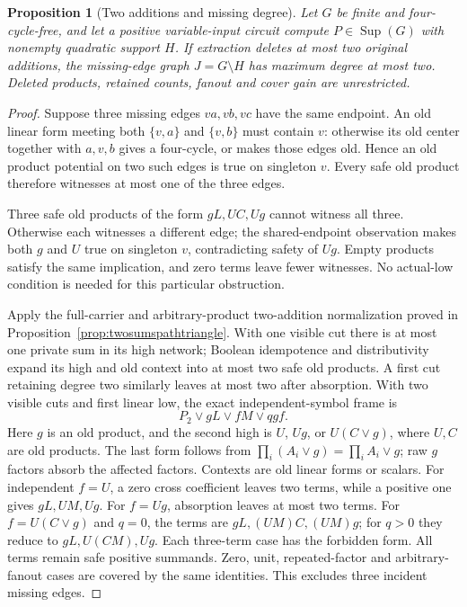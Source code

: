 \documentclass[11pt]{article}
\newcommand{\Sup}{\operatorname{Sup}}
\newtheorem{proposition}[theorem]{Proposition}
\theoremstyle{definition}
\theoremstyle{remark}
\begin{document}
\begin{proposition}[Two additions and missing degree]\label{prop:twosumsdegree}
Let $G$ be finite and four-cycle-free, and let a positive variable-input circuit compute $P\in\Sup(G)$ with nonempty quadratic support $H$. If extraction deletes at most two original additions, the missing-edge graph $J=G\setminus H$ has maximum degree at most two. Deleted products, retained counts, fanout and cover gain are unrestricted.
\end{proposition}
\begin{proof}
Suppose three missing edges $va,vb,vc$ have the same endpoint. An old linear form meeting both $\{v,a\}$ and $\{v,b\}$ must contain $v$: otherwise its old center together with $a,v,b$ gives a four-cycle, or makes those edges old. Hence an old product potential on two such edges is true on singleton $v$. Every safe old product therefore witnesses at most one of the three edges.

Three safe old products of the form $gL,UC,Ug$ cannot witness all three. Otherwise each witnesses a different edge; the shared-endpoint observation makes both $g$ and $U$ true on singleton $v$, contradicting safety of $Ug$. Empty products satisfy the same implication, and zero terms leave fewer witnesses. No actual-low condition is needed for this particular obstruction.

Apply the full-carrier and arbitrary-product two-addition normalization proved in Proposition~\ref{prop:twosumspathtriangle}. With one visible cut there is at most one private sum in its high network; Boolean idempotence and distributivity expand its high and old context into at most two safe old products. A first cut retaining degree two similarly leaves at most two after absorption. With two visible cuts and first linear low, the exact independent-symbol frame is
\[
 P_2\vee gL\vee fM\vee qgf.
\]
Here $g$ is an old product, and the second high is $U$, $Ug$, or $U(C\vee g)$, where $U,C$ are old products. The last form follows from $\prod_i(A_i\vee g)=\prod_i A_i\vee g$; raw $g$ factors absorb the affected factors. Contexts are old linear forms or scalars. For independent $f=U$, a zero cross coefficient leaves two terms, while a positive one gives $gL,UM,Ug$. For $f=Ug$, absorption leaves at most two terms. For $f=U(C\vee g)$ and $q=0$, the terms are $gL,(UM)C,(UM)g$; for $q>0$ they reduce to $gL,U(CM),Ug$. Each three-term case has the forbidden form. All terms remain safe positive summands. Zero, unit, repeated-factor and arbitrary-fanout cases are covered by the same identities. This excludes three incident missing edges.
\end{proof}
\end{document}
